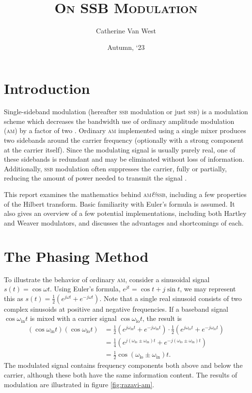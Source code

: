 \documentclass[12pt]{article}
\title{\textsc{On SSB Modulation}}
\author{Catherine Van West}
\date{Autumn, `23}
\newcommand{\amp}{\textit{\&}\xspace}
\newcommand{\am}{\textsc{am}\xspace}
\newcommand{\ssb}{\textsc{ssb}\xspace}
\begin{document}
\maketitle

\section*{Introduction}
Single-sideband modulation (hereafter \ssb modulation or just \ssb) is a
modulation scheme which decreases the bandwidth use of ordinary amplitude
modulation (\am) by a factor of two \autocite{ssb-thaddeus}. Ordinary \am
implemented using a single mixer produces two sidebands around the carrier
frequency (optionally with a strong component at the carrier itself). Since the
modulating signal is usually purely real, one of these sidebands is redundant
and may be eliminated without loss of information. Additionally, \ssb
modulation often suppresses the carrier, fully or partially, reducing the
amount of power needed to transmit the signal \autocite{weaver-rowell}.

This report examines the mathematics behind \am \amp \ssb, including a few
properties of the Hilbert transform. Basic familiarity with Euler's formula is
assumed. It also gives an overview of a few potential implementations,
including both Hartley and Weaver modulators, and discusses the advantages and
shortcomings of each.

\section*{The Phasing Method}

\newcommand{\oin}{\omega_\text{in}}
\newcommand{\olo}{\omega_\text{lo}}

To illustrate the behavior of ordinary \am, consider a sinusoidal signal \(s(t)
= \cos \omega t\). Using Euler's formula, \(e^{jt} = \cos t + j \sin t\), we
may represent this as \(s(t) = \frac 1 2 (e^{j \omega t} + e^{- j \omega t})\).
Note that a single real sinusoid consists of two complex sinusoids at positive
and negative frequencies. If a baseband signal \(\cos \oin t\) is mixed with a
carrier signal \(\cos \olo t\), the result is
\begin{align*}
	\left(\cos \oin t\right) \left(\cos \olo t\right)
		&= \frac 1 2 \left(e^{j \oin t} + e^{-j \oin t}\right)
			\cdot \frac 1 2 \left(
				e^{j \olo t} + e^{-j \olo t}
			\right) \\
		&= \frac 1 4 \left(
			e^{j (\olo \pm \oin) t} + e^{-j (\olo \pm \oin) t}
		\right) \\
		&= \frac 1 2 \cos (\olo \pm \oin) t.
\end{align*}
The modulated signal contains frequency components both above and below the
carrier, although these both have the same information content. The results of
modulation are illustrated in figure \ref{fig:razavi-am}.
\end{document}
